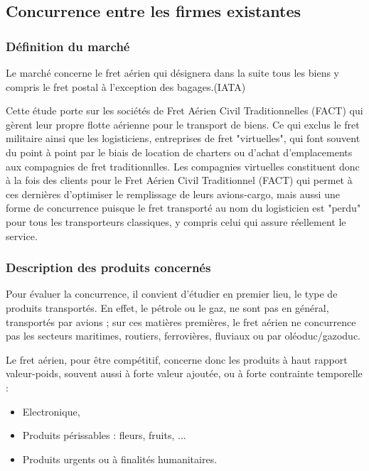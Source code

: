 
\subsection{Concurrence entre les firmes existantes}

\subsubsection{Définition du marché}

Le marché concerne le fret aérien qui désignera dans la suite tous les biens y compris le fret postal à l’exception des bagages.(IATA)

Cette étude porte sur les sociétés de Fret Aérien Civil Traditionnelles (FACT) qui gèrent leur propre flotte aérienne pour le transport de biens. Ce qui exclus le fret militaire ainsi que les logisticiens, entreprises de fret "virtuelles", qui font souvent du point à point par le biais de location de charters ou d'achat d'emplacements aux compagnies de fret traditionnlles. Les compagnies virtuelles constituent donc à la fois des clients pour le Fret Aérien Civil Traditionnel (FACT) qui permet à ces dernières d'optimiser le remplissage de leurs avions-cargo, mais aussi une forme de concurrence puisque le fret transporté au nom du logisticien est "perdu" pour tous les transporteurs classiques, y compris celui qui assure réellement le service. 



\subsubsection{Description des produits concernés}
Pour évaluer la concurrence, il convient d'étudier en premier lieu, le type de produits transportés. En effet, le pétrole ou le gaz, ne sont pas en général, transportés par avions ; sur ces matières premières, le fret aérien ne concurrence pas les secteurs maritimes, routiers, ferrovières, fluviaux ou par oléoduc/gazoduc. 

Le fret aérien, pour être compétitif, concerne donc les produits à haut rapport valeur-poids, souvent aussi à forte valeur ajoutée, ou à forte contrainte temporelle :


\begin{itemize}
	\item Electronique,
	\item Produits périssables : fleurs, fruits, ...
	\item Produits urgents ou à finalités humanitaires.
\end{itemize}



